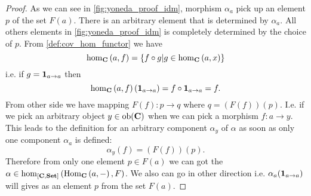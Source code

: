 \begin{lemma}[Yoneda]
\begin{proof}
As we can see in \cref{fig:yoneda_proof_idm}, morphism $\alpha_a$
pick up an element $p$ of the set $F(a)$. There is an arbitrary
element that is determined by $\alpha_a$. All others elements in
\cref{fig:yoneda_proof_idm} is completely determined by the choice of
$p$. From \cref{def:cov_hom_functor} we have
\[
\catmset[C]{a}{f} = \{f \circ g | g \in \catmset[C]{a}{x}\}
\]
i.e. if $g = \mathbf{1}_{ a \to a }$ then 
\[
\catmset[C]{a}{f}\left(\idm{a}\right) = f
\circ \idm{a} = f.
\]
From other side we have mapping $F(f): p \to q$ where 
$q = (F(f))(p)$. I.e. if we pick an arbitrary object $y \in \mathrm{ob}(\mathbf{C})$
when we can pick a morphism $f: a \to y$. This leads to the definition
for an arbitrary component $\alpha_y$ of  $\alpha$
as soon as only one component $\alpha_a$ is defined:
\[
\alpha_y(f) = (F(f))(p).
\]
Therefore from only one element $p \in F(a)$ we can got the
 $\alpha \in
\catmset[\funcat{C}{Set}]{\catcovhom{C}{a}}{F}$. We also can go in
other direction i.e. $\alpha_a(\mathbf{1}_{ a \to a })$ will gives as an element $p$
from the set $F(a)$.
\end{proof}
\end{lemma}

